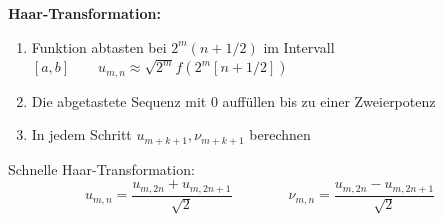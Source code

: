 \textbf{Haar-Transformation:}
\begin{enumerate}
	\item Funktion abtasten bei $2^m(n+1/2)$ im Intervall $[a,b] \qquad u_{m,n}\approx \sqrt{2^m}f(2^m[n+1/2])$ 
	\item Die abgetastete Sequenz mit 0 auffüllen bis zu einer Zweierpotenz
	\item In jedem Schritt $u_{m+k+1}, \nu_{m+k+1}$ berechnen
\end{enumerate}

Schnelle Haar-Transformation:
\[  
	u_{m,n} = \dfrac{u_{m,2n}+u_{m,2n+1}}{\sqrt{2}} 
	\qquad \qquad
	\nu_{m,n} = \dfrac{u_{m,2n}-u_{m,2n+1}}{\sqrt{2}}
\]
